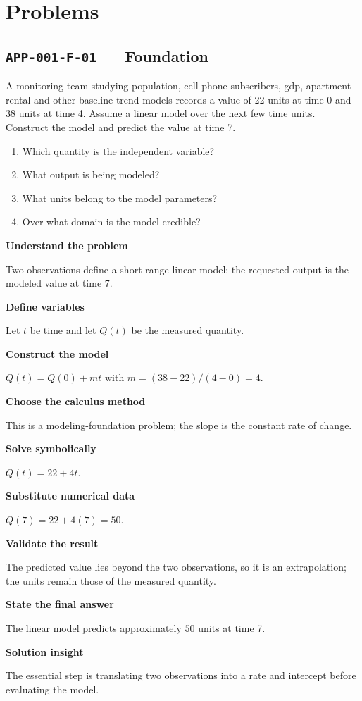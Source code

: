 \documentclass[11pt]{book}
\newcommand{\pid}[1]{\texttt{#1}}
\begin{document}
\section*{Problems}
\subsection*{\pid{APP-001-F-01} — Foundation}
\begin{problembox}
A monitoring team studying population, cell-phone subscribers, gdp, apartment rental and other baseline trend models records a value of 22 units at time 0 and 38 units at time 4. Assume a linear model over the next few time units. Construct the model and predict the value at time 7.
\end{problembox}
\begin{promptbox}\begin{enumerate}
\item Which quantity is the independent variable?
\item What output is being modeled?
\item What units belong to the model parameters?
\item Over what domain is the model credible?
\end{enumerate}\end{promptbox}
\begin{solutionbox}
\textbf{Understand the problem}\par Two observations define a short-range linear model; the requested output is the modeled value at time 7.\par\medskip
\textbf{Define variables}\par Let $t$ be time and let $Q(t)$ be the measured quantity.\par\medskip
\textbf{Construct the model}\par $Q(t)=Q(0)+mt$ with $m=(38-22)/(4-0)=4$.\par\medskip
\textbf{Choose the calculus method}\par This is a modeling-foundation problem; the slope is the constant rate of change.\par\medskip
\textbf{Solve symbolically}\par $Q(t)=22+4t$.\par\medskip
\textbf{Substitute numerical data}\par $Q(7)=22+4(7)=50$.\par\medskip
\textbf{Validate the result}\par The predicted value lies beyond the two observations, so it is an extrapolation; the units remain those of the measured quantity.\par\medskip
\textbf{State the final answer}\par The linear model predicts approximately $50$ units at time 7.\par\medskip
\textbf{Solution insight}\par The essential step is translating two observations into a rate and intercept before evaluating the model.\par\medskip
\end{solutionbox}
\end{document}
